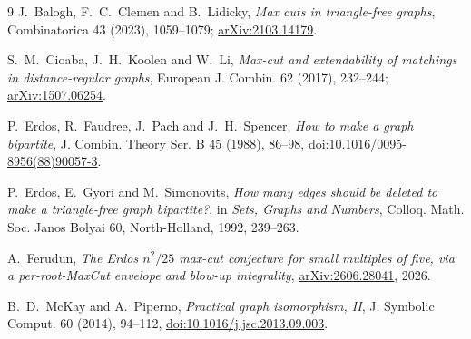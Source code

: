 \documentclass[11pt]{article}
\theoremstyle{definition}
\begin{document}
\begin{thebibliography}{9}
J.~Balogh, F.~C.~Clemen and B.~Lidicky,
\emph{Max cuts in triangle-free graphs},
Combinatorica 43 (2023), 1059--1079;
\href{https://arxiv.org/abs/2103.14179}{arXiv:2103.14179}.

S.~M.~Cioaba, J.~H.~Koolen and W.~Li,
\emph{Max-cut and extendability of matchings in distance-regular graphs},
European J. Combin. 62 (2017), 232--244;
\href{https://arxiv.org/abs/1507.06254}{arXiv:1507.06254}.

P.~Erdos, R.~Faudree, J.~Pach and J.~H.~Spencer,
\emph{How to make a graph bipartite},
J. Combin. Theory Ser. B 45 (1988), 86--98,
\href{https://doi.org/10.1016/0095-8956(88)90057-3}{doi:10.1016/0095-8956(88)90057-3}.

P.~Erdos, E.~Gyori and M.~Simonovits,
\emph{How many edges should be deleted to make a triangle-free graph
bipartite?},
in \emph{Sets, Graphs and Numbers}, Colloq. Math. Soc. Janos Bolyai 60,
North-Holland, 1992, 239--263.

A.~Ferudun,
\emph{The Erdos \(n^2/25\) max-cut conjecture for small multiples of five,
via a per-root-MaxCut envelope and blow-up integrality},
\href{https://arxiv.org/abs/2606.28041}{arXiv:2606.28041}, 2026.

B.~D.~McKay and A.~Piperno,
\emph{Practical graph isomorphism, II},
J. Symbolic Comput. 60 (2014), 94--112,
\href{https://doi.org/10.1016/j.jsc.2013.09.003}{doi:10.1016/j.jsc.2013.09.003}.
\end{thebibliography}
\end{document}
